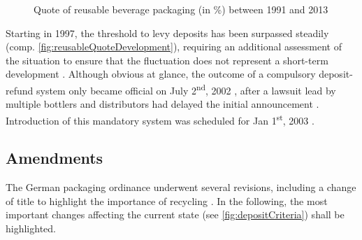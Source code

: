 \begin{figure}[hbt]
	\centering
  	\caption{Quote of reusable beverage packaging (in \%) between 1991 and 2013 \cite[p.~1]{BMU2015} }
  	\label{fig:reusableQuoteDevelopment}
\end{figure}

Starting in 1997, the threshold to levy deposits has been surpassed steadily (comp. \autoref{fig:reusableQuoteDevelopment}), requiring an additional assessment of the situation to ensure that the fluctuation does not represent a short-term development \cite[§ 9]{verpackV1991} \cite[p.~5]{Hartlep2011Recycling}. Although obvious at glance, the outcome of a compulsory deposit-refund system only became official on July 2\textsuperscript{nd}, 2002 \cite[p.~49]{Geyer/Smoltczyk2003}, after a lawsuit lead by multiple bottlers and distributors had delayed the initial announcement \cite{spon2011handel}. Introduction of this mandatory system was scheduled for Jan 1\textsuperscript{st}, 2003 \cite[p.~53]{Geyer/Smoltczyk2003}.

\subsection{Amendments}
The German packaging ordinance underwent several revisions, including a change of title to highlight the importance of recycling \cite{verpackV1998}. In the following, the most important changes affecting the current state (see \autoref{fig:depositCriteria}) shall be highlighted.

